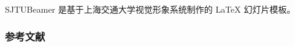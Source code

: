 \documentclass{ctexbeamer}
\begin{document}
\begin{frame}
  SJTUBeamer 是基于上海交通大学视觉形象系统\cite{viman}制作的 \LaTeX{} 幻灯片模板。
\end{frame}
\begin{frame}[allowframebreaks]
  \frametitle{参考文献}
  
\end{frame}
\end{document}
